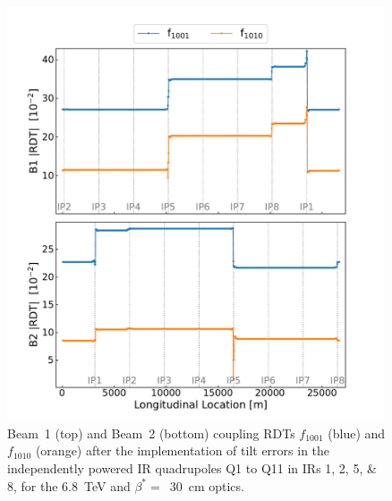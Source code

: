 \begin{figure}[!htb]
    \centering
    \includegraphics*[width=0.99\textwidth]{Figures/ML_for_IR_Coupling/ml_local_sources_rdts_combined.pdf}
    \caption{Beam~\num{1} (top) and Beam~\num{2} (bottom) coupling RDTs \(f_{1001}\) (\textcolor{mplblue}{blue}) and \(f_{1010}\) (\textcolor{mplorange}{orange}) after the implementation of tilt errors in the independently powered IR quadrupoles Q\num{1} to Q\num{11} in IRs \numlist{1;2;5;8}, for the \qty{6.8}{\tera\electronvolt} and \(\beta^{\ast}=\)~\qty{30}{\centi\meter} optics.}
    \label{figure:ml_local_sources_rdts}
\end{figure}


